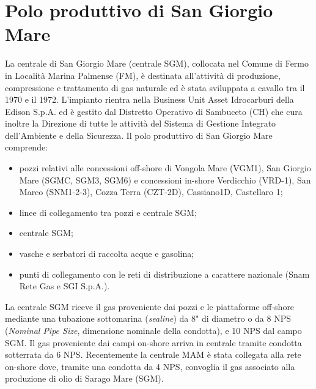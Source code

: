 \section{Polo produttivo di San Giorgio Mare}
La centrale di San Giorgio Mare (centrale SGM), collocata nel Comune di Fermo in Località Marina Palmense (FM), è destinata all'attività di produzione, compressione e trattamento di gas naturale ed è stata sviluppata a cavallo tra il 1970 e il 1972. L'impianto rientra nella Business Unit Asset Idrocarburi della Edison S.p.A. ed è gestito dal Distretto Operativo di Sambuceto (CH) che cura inoltre la Direzione di tutte le attività del Sistema di Gestione Integrato dell'Ambiente e della Sicurezza. Il polo produttivo di San Giorgio Mare comprende:
\begin{itemize}
	\item pozzi relativi alle concessioni off-shore di Vongola Mare (VGM1), San Giorgio Mare (SGMC, SGM3, SGM6) e concessioni in-shore Verdicchio (VRD-1), San Marco (SNM1-2-3), Cozza Terra (CZT-2D), Cassiano1D, Castellaro 1;
	\item linee di collegamento tra pozzi e centrale SGM;
	\item centrale SGM;
	\item vasche e serbatori di raccolta acque e gasolina;
	\item punti di collegamento con le reti di distribuzione a carattere nazionale (Snam Rete Gas e SGI S.p.A.).
\end{itemize}
La centrale SGM riceve il gas proveniente dai pozzi e le piattaforme off-shore mediante una tubazione sottomarina (\textit{sealine}) da 8" di diametro o da 8 NPS (\textit{Nominal Pipe Size}, dimensione nominale della condotta), e 10 NPS dal campo SGM. Il gas proveniente dai campi on-shore arriva in centrale tramite condotta sotterrata da 6 NPS. Recentemente la centrale MAM è stata collegata alla rete on-shore dove, tramite una condotta da 4 NPS, convoglia il gas associato alla produzione  di olio di Sarago Mare (SGM).

